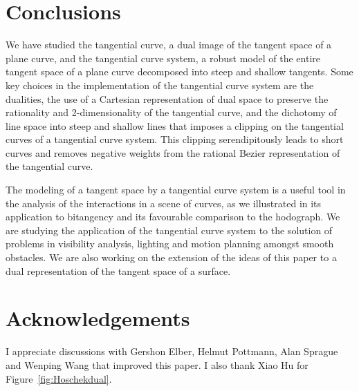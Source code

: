 \documentclass[12pt]{article}
\begin{document}
\section{Conclusions}
\label{sec:conclude}

We have studied the tangential curve, a dual image of the tangent space of
a plane curve, and the tangential curve system, a robust model of the entire tangent
space of a plane curve decomposed into steep and shallow tangents.
Some key choices in the implementation of the tangential curve system
are the dualities,
the use of a Cartesian representation of dual space to preserve the 
rationality and 2-dimensionality of the tangential curve,
and the dichotomy of line space into steep and shallow lines
that imposes a clipping on the 
tangential curves of a tangential curve system.
This clipping serendipitously leads to short curves 
and removes negative weights from the rational Bezier representation
of the tangential curve.

The modeling of a tangent space by a tangential curve system is
a useful tool in the analysis of the interactions in a scene of curves, 
as we illustrated in its application to bitangency 
and its favourable comparison to the hodograph.
We are studying the application of the tangential curve system 
to the solution of problems in visibility analysis,
lighting and motion planning amongst smooth obstacles.
We are also working on the extension of the ideas of this paper to 
a dual representation of the tangent space of a surface.



\section{Acknowledgements}

I appreciate discussions with Gershon Elber, Helmut Pottmann, Alan Sprague
and Wenping Wang that improved this paper.
I also thank Xiao Hu for Figure~\ref{fig:Hoschekdual}.

\end{document}

